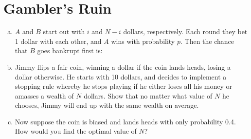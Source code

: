 \documentclass{article}
\begin{document}

\section{Gambler's Ruin}

\begin{enumerate}[(a)]
    \item $A$ and $B$ start out with $i$ and $N-i$ dollars, respectively. Each round they bet 1 dollar with each other, and $A$ wins with probability $p$. Then the chance that $B$ goes bankrupt first is:
    

    \item Jimmy flips a fair coin, winning a dollar if the coin lands heads, losing a dollar otherwise. He starts with 10 dollars, and decides to implement a stopping rule whereby he stops playing if he either loses all his money or amasses a wealth of $N$ dollars. Show that no matter what value of $N$ he chooses, Jimmy will end up with the same wealth on average.
    
    
    \item Now suppose the coin is biased and lands heads with only probability 0.4. How would you find the optimal value of $N$?
    
    

\end{enumerate}
\end{document}
